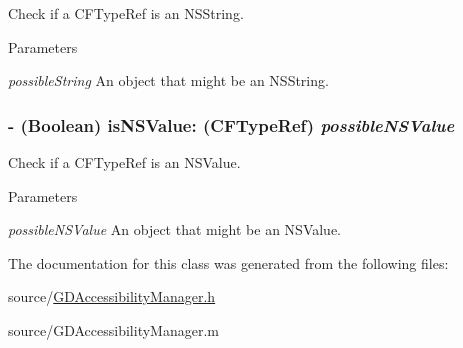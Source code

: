 Check if a CFTypeRef is an NSString. 
\begin{DoxyParams}{Parameters}
\item[{\em possibleString}]An object that might be an NSString. \end{DoxyParams}
\hypertarget{interface_g_d_accessibility_manager_acdce820e06d533b51a1eaec8618019c1}{
\subsubsection[{isNSValue:}]{\setlength{\rightskip}{0pt plus 5cm}-\/ (Boolean) isNSValue: (CFTypeRef) {\em possibleNSValue}}}
\label{interface_g_d_accessibility_manager_acdce820e06d533b51a1eaec8618019c1}


Check if a CFTypeRef is an NSValue. 
\begin{DoxyParams}{Parameters}
\item[{\em possibleNSValue}]An object that might be an NSValue. \end{DoxyParams}


The documentation for this class was generated from the following files:\begin{DoxyCompactItemize}
\item 
source/\hyperlink{_g_d_accessibility_manager_8h}{GDAccessibilityManager.h}\item 
source/GDAccessibilityManager.m\end{DoxyCompactItemize}
